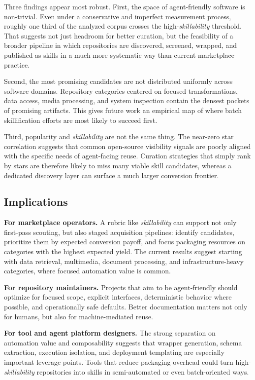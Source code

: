 \documentclass[sigconf,review,anonymous,nonacm]{acmart}
\newcommand{\skillability}{\textit{skillability}\xspace}
\begin{document}
Three findings appear most robust. First, the space of agent-friendly software is non-trivial. Even under a conservative and imperfect measurement process, roughly one third of the analyzed corpus crosses the high-\skillability threshold. That suggests not just headroom for better curation, but the feasibility of a broader pipeline in which repositories are discovered, screened, wrapped, and published as skills in a much more systematic way than current marketplace practice.

Second, the most promising candidates are not distributed uniformly across software domains. Repository categories centered on focused transformations, data access, media processing, and system inspection contain the densest pockets of promising artifacts. This gives future work an empirical map of where batch skillification efforts are most likely to succeed first.

Third, popularity and \skillability are not the same thing. The near-zero star correlation suggests that common open-source visibility signals are poorly aligned with the specific needs of agent-facing reuse. Curation strategies that simply rank by stars are therefore likely to miss many viable skill candidates, whereas a dedicated discovery layer can surface a much larger conversion frontier.

\subsection{Implications}

\textbf{For marketplace operators.} A rubric like \skillability can support not only first-pass scouting, but also staged acquisition pipelines: identify candidates, prioritize them by expected conversion payoff, and focus packaging resources on categories with the highest expected yield. The current results suggest starting with data retrieval, multimedia, document processing, and infrastructure-heavy categories, where focused automation value is common.

\textbf{For repository maintainers.} Projects that aim to be agent-friendly should optimize for focused scope, explicit interfaces, deterministic behavior where possible, and operationally safe defaults. Better documentation matters not only for humans, but also for machine-mediated reuse.

\textbf{For tool and agent platform designers.} The strong separation on automation value and composability suggests that wrapper generation, schema extraction, execution isolation, and deployment templating are especially important leverage points. Tools that reduce packaging overhead could turn high-\skillability repositories into skills in semi-automated or even batch-oriented ways.
\end{document}
